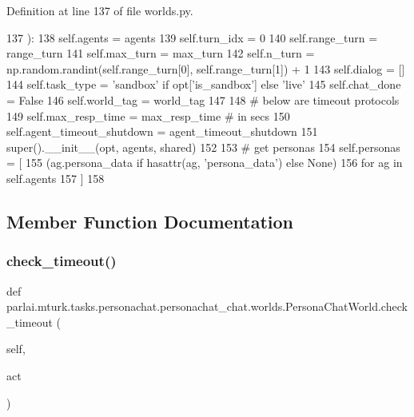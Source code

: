 Definition at line 137 of file worlds.\+py.


\begin{DoxyCode}
137     ):
138         self.agents = agents
139         self.turn\_idx = 0
140         self.range\_turn = range\_turn
141         self.max\_turn = max\_turn
142         self.n\_turn = np.random.randint(self.range\_turn[0], self.range\_turn[1]) + 1
143         self.dialog = []
144         self.task\_type = \textcolor{stringliteral}{'sandbox'} \textcolor{keywordflow}{if} opt[\textcolor{stringliteral}{'is\_sandbox'}] \textcolor{keywordflow}{else} \textcolor{stringliteral}{'live'}
145         self.chat\_done = \textcolor{keyword}{False}
146         self.world\_tag = world\_tag
147 
148         \textcolor{comment}{# below are timeout protocols}
149         self.max\_resp\_time = max\_resp\_time  \textcolor{comment}{# in secs}
150         self.agent\_timeout\_shutdown = agent\_timeout\_shutdown
151         super().\_\_init\_\_(opt, agents, shared)
152 
153         \textcolor{comment}{# get personas}
154         self.personas = [
155             (ag.persona\_data \textcolor{keywordflow}{if} hasattr(ag, \textcolor{stringliteral}{'persona\_data'}) \textcolor{keywordflow}{else} \textcolor{keywordtype}{None})
156             \textcolor{keywordflow}{for} ag \textcolor{keywordflow}{in} self.agents
157         ]
158 
\end{DoxyCode}


\subsection{Member Function Documentation}
\mbox{\label{classparlai_1_1mturk_1_1tasks_1_1personachat_1_1personachat__chat_1_1worlds_1_1PersonaChatWorld_a2d3f943d1fd0d1bff5af9fdcae160439}} 
\subsubsection{\texorpdfstring{check\+\_\+timeout()}{check\_timeout()}}
{\footnotesize\ttfamily def parlai.\+mturk.\+tasks.\+personachat.\+personachat\+\_\+chat.\+worlds.\+Persona\+Chat\+World.\+check\+\_\+timeout (\begin{DoxyParamCaption}\item[{}]{self,  }\item[{}]{act }\end{DoxyParamCaption})}



